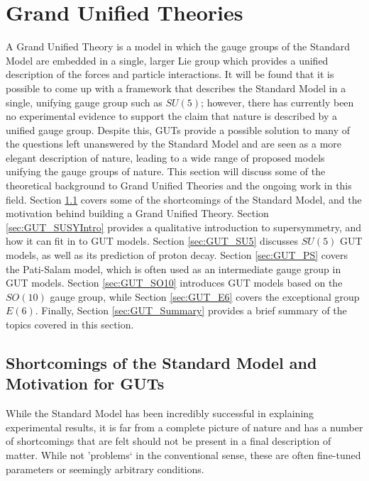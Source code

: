 \documentclass{article}
\begin{document}
\section{Grand Unified Theories}%
\label{sec:GUT}
A Grand Unified Theory is a model in which the gauge groups of the Standard Model are embedded in a single, larger Lie group which provides a unified description of the forces and particle interactions. It will be found that it is possible to come up with a framework that describes the Standard Model in a single, unifying gauge group such as $SU(5)$; however, there has currently been no experimental evidence to support the claim that nature is described by a unified gauge group. Despite this, GUTs provide a possible solution to many of the questions left unanswered by the Standard Model and are seen as a more elegant description of nature, leading to a wide range of proposed models unifying the gauge groups of nature. This section will discuss some of the theoretical background to Grand Unified Theories and the ongoing work in this field.
Section \ref{sec:GUT_SMShortcomings} covers some of the shortcomings of the Standard Model, and the motivation behind building a Grand Unified Theory. Section \ref{sec:GUT_SUSYIntro} provides a qualitative introduction to supersymmetry, and how it can fit in to GUT models. Section \ref{sec:GUT_SU5} discusses $SU(5)$ GUT models, as well as its prediction of proton decay. Section \ref{sec:GUT_PS} covers the Pati-Salam model, which is often used as an intermediate gauge group in GUT models. Section \ref{sec:GUT_SO10} introduces GUT models based on the $SO(10)$ gauge group, while Section \ref{sec:GUT_E6} covers the exceptional group $E(6)$. Finally, Section \ref{sec:GUT_Summary} provides a brief summary of the topics covered in this section.

\subsection{Shortcomings of the Standard Model and Motivation for GUTs}%
\label{sec:GUT_SMShortcomings}
While the Standard Model has been incredibly successful in explaining experimental results, it is far from a complete picture of nature and has a number of shortcomings that are felt should not be present in a final description of matter. While not 'problems` in the conventional sense, these are often fine-tuned parameters or seemingly arbitrary conditions.
\end{document}
